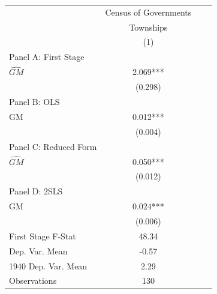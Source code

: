 \begin{tabular}{l*{3}{c}} \toprule
&\multicolumn{1}{c}{Census of Governments}\\\cmidrule(lr){2-2}
&\multicolumn{1}{c}{Townships}\\\cmidrule(lr){2-2}
&\multicolumn{1}{c}{(1)}\\
\cmidrule(lr){1-2}
\multicolumn{1}{l}{Panel A: First Stage}\\
\cmidrule(lr){1-2}
$\widehat{GM}$  &    2.069***\\
                &  (0.298)   \\
\cmidrule(lr){1-2}
\multicolumn{1}{l}{Panel B: OLS}\\
\cmidrule(lr){1-2}
GM              &    0.012***\\
                &  (0.004)   \\
\cmidrule(lr){1-2}
\multicolumn{1}{l}{Panel C: Reduced Form}\\
\cmidrule(lr){1-2}
$\widehat{GM}$  &    0.050***\\
                &  (0.012)   \\
\cmidrule(lr){1-2}
\multicolumn{1}{l}{Panel D: 2SLS}\\
\cmidrule(lr){1-2}
GM              &    0.024***\\
                &  (0.006)   \\
\midrule
First Stage F-Stat&    48.34   \\
Dep. Var. Mean  &    -0.57   \\
1940 Dep. Var. Mean&     2.29   \\
Observations    &      130   \\
 \bottomrule \end{tabular}
